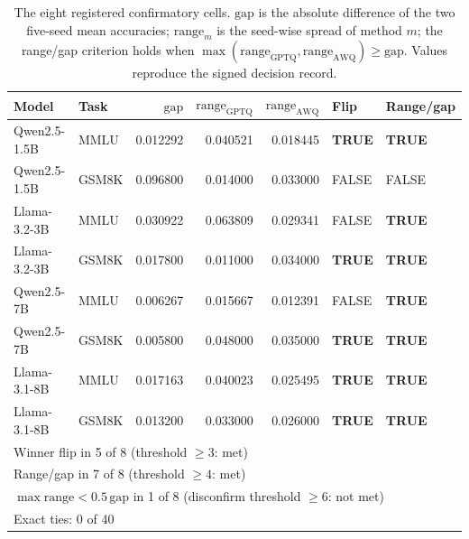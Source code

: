 \begin{table}[!t]
\centering
\small
\caption{The eight registered confirmatory cells. $\mathrm{gap}$ is the absolute
difference of the two five-seed mean accuracies; $\mathrm{range}_m$ is the
seed-wise spread of method $m$; the range/gap criterion holds when
$\max(\mathrm{range}_{\mathrm{GPTQ}},\mathrm{range}_{\mathrm{AWQ}}) \geq
\mathrm{gap}$. Values reproduce the signed decision record.}
\label{tab:h3-eightcell}
\setlength{\tabcolsep}{3pt}
\small
\begin{tabular}{llrrrll}
\toprule
Model & Task & $\mathrm{gap}$ & $\mathrm{range}_{\mathrm{GPTQ}}$ & $\mathrm{range}_{\mathrm{AWQ}}$ & Flip & Range/gap \\
\midrule
Qwen2.5-1.5B & MMLU  & 0.012292 & 0.040521 & 0.018445 & \textbf{TRUE}  & \textbf{TRUE} \\
Qwen2.5-1.5B & GSM8K & 0.096800 & 0.014000 & 0.033000 & FALSE          & FALSE \\
Llama-3.2-3B & MMLU  & 0.030922 & 0.063809 & 0.029341 & FALSE          & \textbf{TRUE} \\
Llama-3.2-3B & GSM8K & 0.017800 & 0.011000 & 0.034000 & \textbf{TRUE}  & \textbf{TRUE} \\
Qwen2.5-7B   & MMLU  & 0.006267 & 0.015667 & 0.012391 & FALSE          & \textbf{TRUE} \\
Qwen2.5-7B   & GSM8K & 0.005800 & 0.048000 & 0.035000 & \textbf{TRUE}  & \textbf{TRUE} \\
Llama-3.1-8B & MMLU  & 0.017163 & 0.040023 & 0.025495 & \textbf{TRUE}  & \textbf{TRUE} \\
Llama-3.1-8B & GSM8K & 0.013200 & 0.033000 & 0.026000 & \textbf{TRUE}  & \textbf{TRUE} \\
\midrule
\multicolumn{7}{l}{Winner flip in 5 of 8 (threshold $\geq 3$: met)} \\
\multicolumn{7}{l}{Range/gap in 7 of 8 (threshold $\geq 4$: met)} \\
\multicolumn{7}{l}{$\max\mathrm{range} < 0.5\,\mathrm{gap}$ in 1 of 8 (disconfirm threshold $\geq 6$: not met)} \\
\multicolumn{7}{l}{Exact ties: 0 of 40} \\
\bottomrule
\end{tabular}
\end{table}

